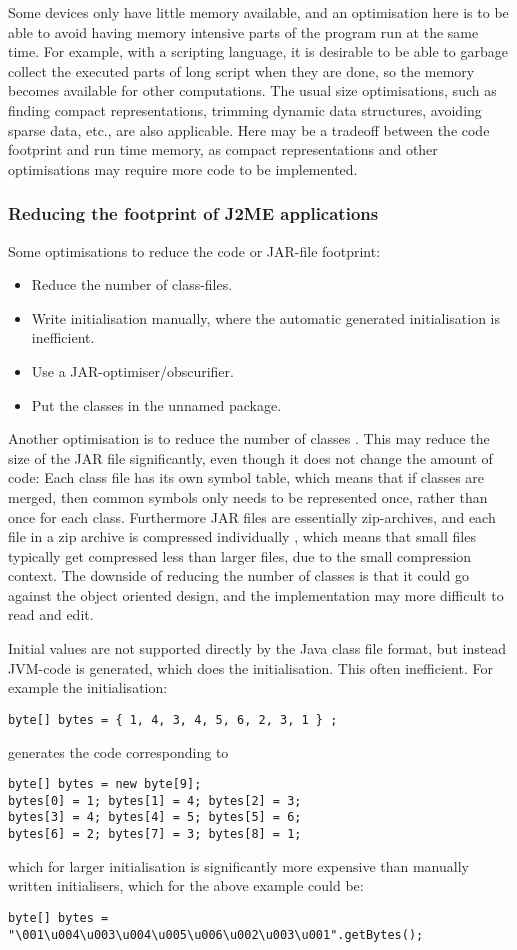 \documentclass[11pt]{report}
\begin{document}
Some devices only have little memory available,
and an optimisation here is to be able to avoid having memory intensive parts of the program run at the same time. For example, with a scripting language, it is desirable to be able to garbage collect the executed parts of long script when they are done, so the memory becomes available for other computations.
The usual size optimisations, such as finding compact representations, trimming dynamic data structures, avoiding sparse data, etc., are also applicable.
Here may be a tradeoff between the code footprint and run time memory, as compact representations and other optimisations may require more code to be implemented.

\subsubsection{Reducing the footprint of J2ME applications}
Some optimisations to reduce the code or JAR-file footprint:
\begin{itemize}
\item Reduce the number of class-files.
\item Write initialisation manually, where the automatic generated initialisation is inefficient.
\item Use a JAR-optimiser/obscurifier.
\item Put the classes in the unnamed package.
\end{itemize}

Another optimisation is to reduce the number of classes \cite{nokia-optim, kahlua-thesis}.
This may reduce the size of the JAR file significantly,
even though it does not change the amount of code:
Each class file has its own symbol table, which means that if classes are merged, then common symbols only needs to be represented once, rather than once for each class.
Furthermore JAR files are essentially zip-archives, and each file in a zip archive is compressed individually \cite{zipspec}, which means that small files typically get compressed less than larger files, due to the small compression context.
The downside of reducing the number of classes is that it could go against the object oriented design, and the implementation may more difficult to read and edit.

Initial values are not supported directly by the Java class file format, but instead
JVM-code is generated, which does the initialisation. 
This often inefficient. For example the initialisation:
\begin{verbatim}
byte[] bytes = { 1, 4, 3, 4, 5, 6, 2, 3, 1 } ;
\end{verbatim}
generates the code corresponding to
\begin{verbatim}
byte[] bytes = new byte[9];
bytes[0] = 1; bytes[1] = 4; bytes[2] = 3;
bytes[3] = 4; bytes[4] = 5; bytes[5] = 6;
bytes[6] = 2; bytes[7] = 3; bytes[8] = 1;
\end{verbatim}
which for larger initialisation is significantly more expensive than manually written initialisers,
which for the above example could be:
\begin{verbatim}
byte[] bytes = "\001\u004\u003\u004\u005\u006\u002\u003\u001".getBytes();
\end{verbatim}
\end{document}
